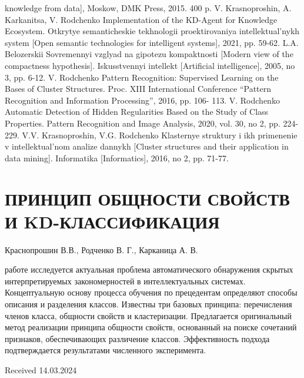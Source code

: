\documentclass{article}
\begin{document}
\begin{multicols}{2}
\begin{thebibliography}{26}
knowledge from data], Moskow, DMK Press, 2015. 400 p.
 V. Krasnoproshin, A. Karkanitsa, V. Rodchenko Implementation
of the KD-Agent for Knowledge Ecosystem. Otkrytye semanticheskie tekhnologii proektirovaniya intellektual’nykh system [Open
semantic technologies for intelligent systems], 2021, pp. 59-62.
 L.A. Belozerskii Sovremennyi vzglyad na gipotezu kompaktnosti
[Modern view of the compactness hypothesis]. Iskusstvennyi
intellekt [Artificial intelligence], 2005, no 3, pp. 6-12.
 V. Rodchenko Pattern Recognition: Supervised Learning on the
Bases of Cluster Structures. Proc. XIII International Conference
“Pattern Recognition and Information Processing”, 2016, pp. 106-
113.
 V. Rodchenko Automatic Detection of Hidden Regularities Based
on the Study of Class Properties. Pattern Recognition and Image
Analysis, 2020, vol. 30, no 2, pp. 224-229.
 V.V. Krasnoproshin, V.G. Rodchenko Klasternye struktury i ikh
primenenie v intellektual’nom analize dannykh [Cluster structures
and their application in data mining]. Informatika [Informatics],
2016, no 2, pp. 71-77.
\end{thebibliography}
\titlespacing*{\section}{5pt}{5pt}{0pt}{}
\section*{\centering\fontsize{8pt}{9pt}\selectfont\textbf{ПРИНЦИП ОБЩНОСТИ СВОЙСТВ И
KD-КЛАССИФИКАЦИЯ}}
\begin{center}
\fontsize{9pt}{9pt}\selectfont
{Краснопрошин В.В., Родченко В. Г., Карканица А. В.}
\end{center}
\vspace{-0.5em}
\fontsize{9pt}{9pt}\selectfont
{} работе исследуется актуальная проблема автоматического обнаружения скрытых интерпретируемых закономерностей в интеллектуальных системах. Концептуальную
основу процесса обучения по прецедентам определяют способы описания и разделения классов. Известны три базовых
принципа: перечисления членов класса, общности свойств
и кластеризации. Предлагается оригинальный метод реализации принципа общности свойств, основанный на поиске
сочетаний признаков, обеспечивающих различение классов.
Эффективность подхода подтверждается результатами численного эксперимента.
\vspace{-4mm}
\begin{flushright}
Received 14.03.2024
\end{flushright}
\end{multicols}
\end{document}
